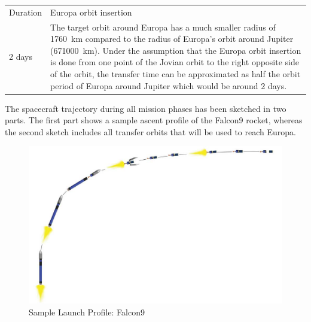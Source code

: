 \begin{longtable}{lp{}}
  Duration & Europa orbit insertion \\ \cmidrule{2-2}

  2 days

  & The target orbit around Europa has a much smaller radius of
  \SI{1760}{km} compared to the radius of Europa's orbit around
  Jupiter (\SI{671000}{km}).  Under the assumption that the Europa
  orbit insertion is done from one point of the Jovian orbit to the
  right opposite side of the orbit, the transfer time can be
  approximated as half the orbit period of Europa around Jupiter which
  would be around 2 days. \\
\end{longtable}



The spacecraft trajectory during all mission phases has been sketched
in two parts. The first part shows a sample ascent profile of the
Falcon9 rocket, whereas the second sketch includes all transfer orbits
that will be used to reach Europa.

\begin{figure}[H]
  \center
  \includegraphics[width=.8\textwidth]{Launch-Profile}
  \caption{Sample Launch Profile: Falcon9 \cite{LVCFalcon9}}
\end{figure}

